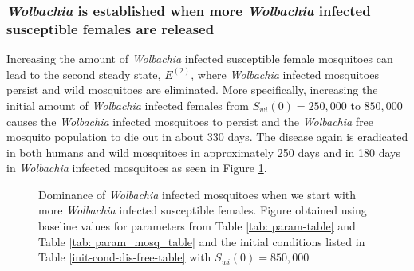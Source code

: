 \documentclass{ws-rv9x6}
\begin{document}
\subsubsection{\textit{Wolbachia} is established when more \textit{Wolbachia} infected susceptible females are released}\label{morefemales} 


Increasing the amount of \textit{Wolbachia} infected susceptible female mosquitoes can lead to the second steady state, $E^{(2)}$, where \textit{Wolbachia} infected mosquitoes persist and wild mosquitoes are eliminated. 
More specifically, increasing the initial amount of \textit{Wolbachia} infected females from $S_{wi}(0)=250,000$ to $850,000$ causes the \textit{Wolbachia} infected mosquitoes to persist and the \textit{Wolbachia} free mosquito population to die out in about 330 days. The disease again is eradicated in both humans and wild mosquitoes in approximately 250 days and in 180 days in \textit{Wolbachia} infected mosquitoes as seen in Figure \ref{domiWolbInfFem}.


\begin{figure}[H]
    \centering
    
    \caption{Dominance of \textit{Wolbachia} infected mosquitoes when we start with more \textit{Wolbachia} infected susceptible females. Figure  obtained using baseline values for parameters from Table \ref{tab: param-table} and Table \ref{tab: param_mosq_table} and the initial conditions listed in Table \ref{init-cond-dis-free-table} with $S_{wi}(0)=850,000$ }
    \label{domiWolbInfFem}
\end{figure}
\end{document}
